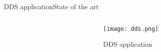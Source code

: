 \begin{frame}{DDS application}{State of the art}
\begin{columns}
\begin{column}{0.65\textwidth}
		\end{column}
		
		\begin{column}{0.35\textwidth}
			\begin{center}
			
				\begin{figure}
					\texttt{[image: dds.png]}
					\caption{\label{fig:dds} DDS application}
				\end{figure}
				
			\end{center}
		\end{column}
		
	\end{columns}
	
\end{frame}


